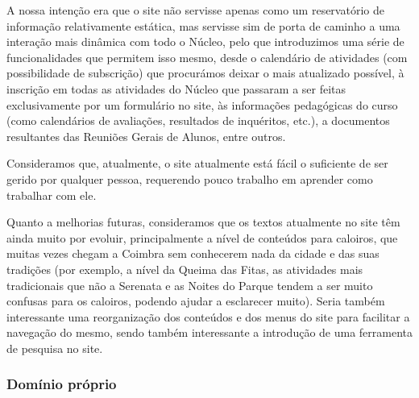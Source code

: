 A nossa intenção era que o site não servisse apenas como um reservatório de informação relativamente estática, mas servisse sim de porta de caminho a uma interação mais dinâmica com todo o Núcleo, pelo que introduzimos uma série de funcionalidades que permitem isso mesmo, desde o calendário de atividades (com possibilidade de subscrição) que procurámos deixar o mais atualizado possível, à inscrição em todas as atividades do Núcleo que passaram a ser feitas exclusivamente por um formulário no site, às informações pedagógicas do curso (como calendários de avaliações, resultados de inquéritos, etc.), a documentos resultantes das Reuniões Gerais de Alunos, entre outros.

Consideramos que, atualmente, o site atualmente está fácil o suficiente de ser gerido por qualquer pessoa, requerendo pouco trabalho em aprender como trabalhar com ele.

Quanto a melhorias futuras, consideramos que os textos atualmente no site têm ainda muito por evoluir, principalmente a nível de conteúdos para caloiros, que muitas vezes chegam a Coimbra sem conhecerem nada da cidade e das suas tradições (por exemplo, a nível da Queima das Fitas, as atividades mais tradicionais que não a Serenata e as Noites do Parque tendem a ser muito confusas para os caloiros, podendo ajudar a esclarecer muito). Seria também interessante uma reorganização dos conteúdos e dos menus do site para facilitar a navegação do mesmo, sendo também interessante a introdução de uma ferramenta de pesquisa no site.

\subsubsection{Domínio próprio} \label{subsubsec:dominio}

